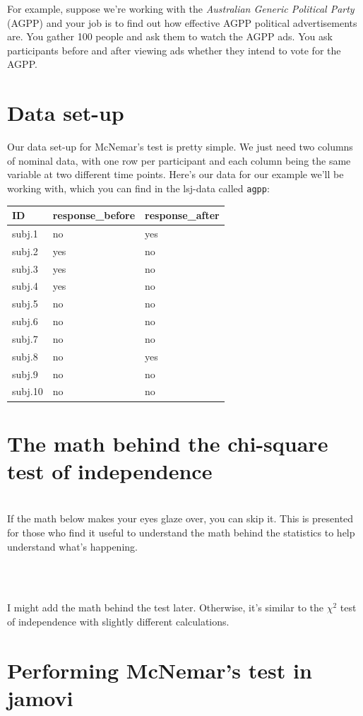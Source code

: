 \documentclass[
]{book}
\newenvironment{info}
    {
    \hline\\
    }
    { 
    \\\\\hline
    }
\begin{document}
For example, suppose we're working with the \emph{Australian Generic Political Party} (AGPP) and your job is to find out how effective AGPP political advertisements are. You gather 100 people and ask them to watch the AGPP ads. You ask participants before and after viewing ads whether they intend to vote for the AGPP.

\hypertarget{data-set-up-7}{%
\section{Data set-up}\label{data-set-up-7}}

Our data set-up for McNemar's test is pretty simple. We just need two columns of nominal data, with one row per participant and each column being the same variable at two different time points. Here's our data for our example we'll be working with, which you can find in the lsj-data called \texttt{agpp}:

\begin{longtable}[]{@{}lll@{}}
\toprule
ID & response\_before & response\_after\tabularnewline
\midrule
\endhead
subj.1 & no & yes\tabularnewline
subj.2 & yes & no\tabularnewline
subj.3 & yes & no\tabularnewline
subj.4 & yes & no\tabularnewline
subj.5 & no & no\tabularnewline
subj.6 & no & no\tabularnewline
subj.7 & no & no\tabularnewline
subj.8 & no & yes\tabularnewline
subj.9 & no & no\tabularnewline
subj.10 & no & no\tabularnewline
\bottomrule
\end{longtable}

\hypertarget{the-math-behind-the-chi-square-test-of-independence-1}{%
\section{The math behind the chi-square test of independence}\label{the-math-behind-the-chi-square-test-of-independence-1}}

\begin{info}
If the math below makes your eyes glaze over, you can skip it. This is
presented for those who find it useful to understand the math behind the
statistics to help understand what's happening.
\end{info}

I might add the math behind the test later. Otherwise, it's similar to the \(\chi^2\) test of independence with slightly different calculations.

\hypertarget{performing-mcnemars-test-in-jamovi}{%
\section{Performing McNemar's test in jamovi}\label{performing-mcnemars-test-in-jamovi}}
\end{document}
